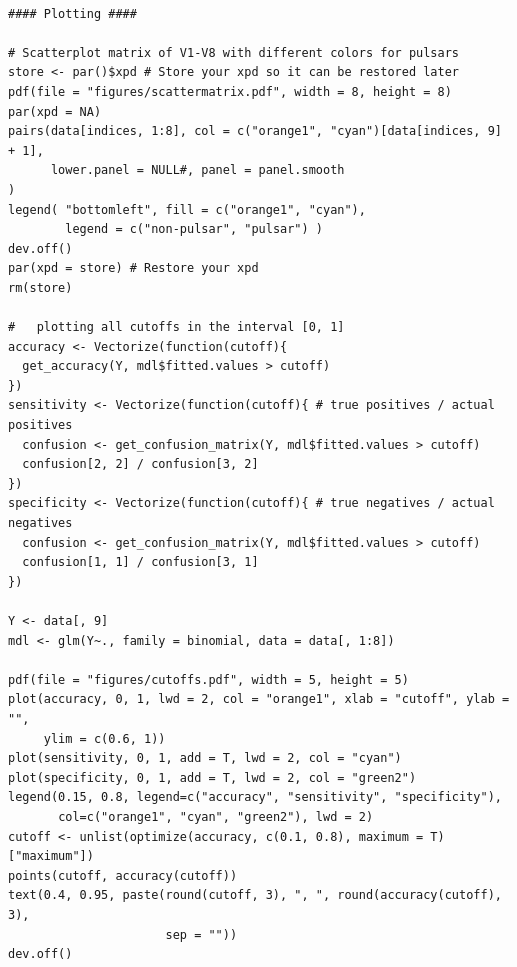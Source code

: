 \documentclass[11pt, oneside]{article}
\begin{document}
\begin{lstlisting}

#### Plotting ####

# Scatterplot matrix of V1-V8 with different colors for pulsars 
store <- par()$xpd # Store your xpd so it can be restored later
pdf(file = "figures/scattermatrix.pdf", width = 8, height = 8)
par(xpd = NA)
pairs(data[indices, 1:8], col = c("orange1", "cyan")[data[indices, 9] + 1],
      lower.panel = NULL#, panel = panel.smooth
)
legend( "bottomleft", fill = c("orange1", "cyan"), 
        legend = c("non-pulsar", "pulsar") )
dev.off()
par(xpd = store) # Restore your xpd
rm(store)

#   plotting all cutoffs in the interval [0, 1]
accuracy <- Vectorize(function(cutoff){
  get_accuracy(Y, mdl$fitted.values > cutoff)
})
sensitivity <- Vectorize(function(cutoff){ # true positives / actual positives
  confusion <- get_confusion_matrix(Y, mdl$fitted.values > cutoff)
  confusion[2, 2] / confusion[3, 2]
})
specificity <- Vectorize(function(cutoff){ # true negatives / actual negatives 
  confusion <- get_confusion_matrix(Y, mdl$fitted.values > cutoff)
  confusion[1, 1] / confusion[3, 1]
})

Y <- data[, 9]
mdl <- glm(Y~., family = binomial, data = data[, 1:8])

pdf(file = "figures/cutoffs.pdf", width = 5, height = 5)
plot(accuracy, 0, 1, lwd = 2, col = "orange1", xlab = "cutoff", ylab = "", 
     ylim = c(0.6, 1))
plot(sensitivity, 0, 1, add = T, lwd = 2, col = "cyan")
plot(specificity, 0, 1, add = T, lwd = 2, col = "green2")
legend(0.15, 0.8, legend=c("accuracy", "sensitivity", "specificity"),
       col=c("orange1", "cyan", "green2"), lwd = 2)
cutoff <- unlist(optimize(accuracy, c(0.1, 0.8), maximum = T)["maximum"])
points(cutoff, accuracy(cutoff))
text(0.4, 0.95, paste(round(cutoff, 3), ", ", round(accuracy(cutoff), 3), 
                      sep = ""))
dev.off()

\end{lstlisting}
\end{document}
